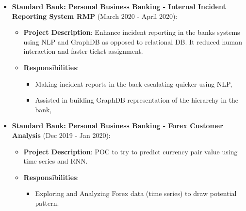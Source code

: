 \documentclass[11pt, letterpaper]{moderncv}        %
\begin{document}
{\begin{itemize}
\begin{itemize}
\begin{itemize}
				\item Build REST API to control the daily pulls and internal calculations,
				\item Wrote from scratch mathematical calculations from C\# to Python since using Python stack
			\end{itemize}
		\end{itemize}
		\item \textbf{Standard Bank: Personal Business Banking - Internal Incident Reporting System RMP} (March 2020 - April 2020): 
		\begin{itemize}
		\item \textbf{Project Description}: Enhance incident reporting in the banks systems using NLP and GraphDB as opposed to relational DB. It reduced human interaction and faster ticket assignment.
		\item \textbf{Responsibilities}:
		\begin{itemize}
			\item Making incident reports in the back escalating quicker using NLP,
			\item Assisted in building GraphDB representation of the hierarchy in the bank,
		\end{itemize}
		\end{itemize}		
		\item \textbf{Standard Bank: Personal Business Banking - Forex Customer Analysis} (Dec 2019 - Jan 2020): 
		\begin{itemize}
		\item \textbf{Project Description}: POC to try to predict currency pair value using time series and RNN.
		\item \textbf{Responsibilities}:
		\begin{itemize}
			\item Exploring and Analyzing Forex data (time series) to draw potential pattern.
		\end{itemize}
	\end{itemize}
\end{itemize}}
\end{document}
